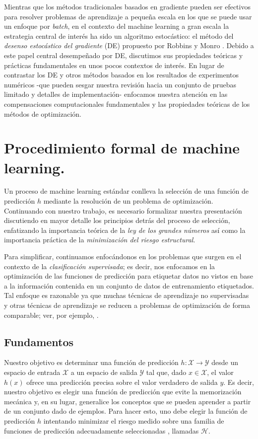 Mientras que los m\'etodos tradicionales basados en gradiente pueden ser efectivos para resolver problemas de aprendizaje a peque\~na escala en los que se puede usar un enfoque por \textit{batch}, en el contexto del machine learning a gran escala la estrategia central de inter\'es ha sido un algoritmo estoc\'astico: el m\'etodo del \textit{desenso estoc\'astico del gradiente} (DE) propuesto por Robbins y Monro \cite{robbins:1951}. Debido a este papel central desempe\~nado por DE, discutimos sus propiedades te\'oricas y pr\'acticas fundamentales en unos pocos contextos de inter\'es. En lugar de contrastar los DE y otros m\'etodos basados en los resultados de experimentos num\'ericos -que pueden sesgar nuestra revisi\'on hacia un conjunto de pruebas limitado y detalles de implementaci\'on- enfocamos nuestra atenci\'on en las compensaciones computacionales fundamentales y las propiedades te\'oricas de los m\'etodos de optimizaci\'on.

\section{Procedimiento formal de machine learning.}

Un proceso de machine learning est\'andar conlleva la selecci\'on de una funci\'on de predicci\'on $h$ mediante la resoluci\'on de un problema de optimizaci\'on. Continuando con nuestro trabajo, es necesario formalizar nuestra presentaci\'on discutiendo en mayor detalle los principios detr\'as del proceso de selecci\'on, enfatizando la importancia te\'orica de la \textit{ley de los grandes n\'umeros} as\'i como la importancia pr\'actica de la \textit{minimizaci\'on del riesgo estructural}.


Para simplificar, continuamos enfoc\'andonos en los problemas que surgen en el contexto de la \textit{clasificaci\'on supervisada}; es decir, nos enfocamos en la optimizaci\'on de las funciones de predicci\'on para etiquetar datos no vistos en base a la informaci\'on contenida en un conjunto de datos de entrenamiento etiquetados. Tal enfoque es razonable ya que muchas t\'ecnicas de aprendizaje no supervisadas y otras t\'ecnicas de aprendizaje se reducen a problemas de optimizaci\'on de forma comparable; ver, por ejemplo, \cite{vapnik:1982}.

\subsection{Fundamentos} 
Nuestro objetivo es determinar una funci\'on de predicci\'on  $h:\mathcal{X} \rightarrow \mathcal{Y}$ desde un espacio de entrada $\mathcal{X}$ a un espacio de salida $\mathcal{Y}$ tal que, dado $x \in \mathcal{X}$, el valor $h (x)$ ofrece una predicci\'on precisa sobre el valor verdadero de salida $y$. Es decir, nuestro objetivo es elegir una funci\'on de predicci\'on que evite la memorizaci\'on mec\'anica y, en su lugar, generalice los conceptos que se pueden aprender a partir de un conjunto dado de ejemplos. Para hacer esto, uno debe elegir la funci\'on de predicci\'on $h$ intentando minimizar el riesgo medido sobre una familia de funciones de predicci\'on adecuadamente seleccionadas \cite{vapnik:1971}, llamadas $\mathcal{H}$.

